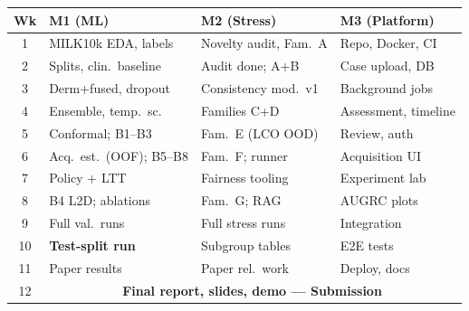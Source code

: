 \documentclass[conference]{IEEEtran}
\newcommand{\1}{\mathbf{1}}
\begin{document}
\begin{table}[H]
  \centering
  \small
  \renewcommand{\arraystretch}{1.15}
  \setlength{\tabcolsep}{3pt}
  \begin{tabular}{clll}
    \toprule
    \textbf{Wk}
      & \textbf{M1 (ML)}
      & \textbf{M2 (Stress)}
      & \textbf{M3 (Platform)} \\
    \midrule
    1 & MILK10k EDA, labels & Novelty audit, Fam.\ A & Repo, Docker, CI \\
    2 & Splits, clin.\ baseline & Audit done; A+B & Case upload, DB \\
    3 & Derm+fused, dropout & Consistency mod.\ v1 & Background jobs \\
    4 & Ensemble, temp.\ sc. & Families C+D & Assessment, timeline \\
    5 & Conformal; B1--B3 & Fam.\ E (LCO OOD) & Review, auth \\
    6 & Acq.\ est.\ (OOF); B5--B8 & Fam.\ F; runner & Acquisition UI \\
    7 & Policy + LTT & Fairness tooling & Experiment lab \\
    8 & B4 L2D; ablations & Fam.\ G; RAG & AUGRC plots \\
    9 & Full val.\ runs & Full stress runs & Integration \\
    10 & \textbf{Test-split run} & Subgroup tables & E2E tests \\
    11 & Paper results & Paper rel.\ work & Deploy, docs \\
    12 & \multicolumn{3}{c}{\textbf{Final report, slides, demo — Submission}} \\
    \bottomrule
  \end{tabular}
\end{table}

\balance
\end{document}
